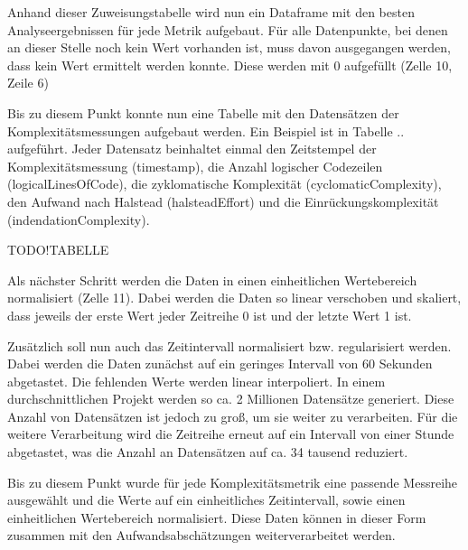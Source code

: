 \lstset{style=pythonStyle}


Anhand dieser Zuweisungstabelle wird nun ein Dataframe mit den besten
Analyseergebnissen für jede Metrik aufgebaut. Für alle Datenpunkte, bei
denen an dieser Stelle noch kein Wert vorhanden ist, muss davon
ausgegangen werden, dass kein Wert ermittelt werden konnte. Diese werden
mit 0 aufgefüllt (Zelle 10, Zeile 6)

\lstset{style=pythonStyle}


Bis zu diesem Punkt konnte nun eine Tabelle mit den Datensätzen der
Komplexitätsmessungen aufgebaut werden. Ein Beispiel ist in Tabelle ..
aufgeführt. Jeder Datensatz beinhaltet einmal den Zeitstempel der
Komplexitätsmessung (timestamp), die Anzahl logischer Codezeilen
(logicalLinesOfCode), die zyklomatische Komplexität
(cyclomaticComplexity), den Aufwand nach Halstead (halsteadEffort) und
die Einrückungskomplexität (indendationComplexity).

TODO!TABELLE

Als nächster Schritt werden die Daten in einen einheitlichen
Wertebereich normalisiert (Zelle 11). Dabei werden die Daten so linear
verschoben und skaliert, dass jeweils der erste Wert jeder Zeitreihe 0
ist und der letzte Wert 1 ist.

\lstset{style=pythonStyle}


Zusätzlich soll nun auch das Zeitintervall normalisiert bzw.
regularisiert werden. Dabei werden die Daten zunächst auf ein geringes
Intervall von 60 Sekunden abgetastet. Die fehlenden Werte werden linear
interpoliert. In einem durchschnittlichen Projekt werden so ca. 2
Millionen Datensätze generiert. Diese Anzahl von Datensätzen ist jedoch
zu gro\ss , um sie weiter zu verarbeiten. Für die weitere Verarbeitung wird
die Zeitreihe erneut auf ein Intervall von einer Stunde abgetastet, was
die Anzahl an Datensätzen auf ca. 34 tausend reduziert.

\lstset{style=pythonStyle}


Bis zu diesem Punkt wurde für jede Komplexitätsmetrik eine passende
Messreihe ausgewählt und die Werte auf ein einheitliches Zeitintervall,
sowie einen einheitlichen Wertebereich normalisiert. Diese Daten können
in dieser Form zusammen mit den Aufwandsabschätzungen weiterverarbeitet
werden.

